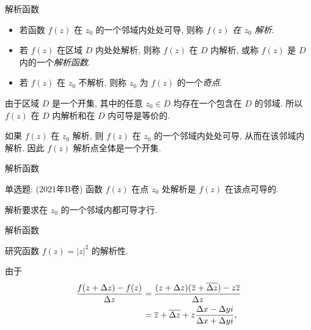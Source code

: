 \begin{frame}{解析函数}
	\onslide<+->
	\begin{definition}
		\begin{itemize}
			\item 若函数 $f(z)$ 在 $z_0$ 的一个邻域内处处可导, 则称 \emph{$f(z)$ 在 $z_0$ 解析}.
			\item 若 $f(z)$ 在区域 $D$ 内处处解析, 则称 $f(z)$ 在 $D$ 内解析, 或称 $f(z)$ 是 $D$ 内的一个\emph{解析函数}.
			\item 若 $f(z)$ 在 $z_0$ 不解析, 则称 $z_0$ 为 $f(z)$ 的一个\emph{奇点}.
		\end{itemize}
	\end{definition}

	\onslide<+->
	由于区域 $D$ 是一个开集, 其中的任意 $z_0\in D$ 均存在一个包含在 $D$ 的邻域. 
	\onslide<+->
	所以 \alert{$f(z)$ 在 $D$ 内解析和在 $D$ 内可导是等价的}.

	\onslide<+->
	如果 $f(z)$ 在 $z_0$ 解析, 则 $f(z)$ 在 $z_0$ 的一个邻域内处处可导, 从而在该邻域内解析.
	\onslide<+->
	因此 \alert{$f(z)$ 解析点全体是一个开集}.
\end{frame}


\begin{frame}{解析函数}
	\onslide<+->
	\begin{exercise}
		单选题: (2021年B卷) 函数 $f(z)$ 在点 $z_0$ 处解析是 $f(z)$ 在该点可导的.
	\end{exercise}

	\onslide<+->
	\begin{answer}
		解析要求在 $z_0$ 的一个邻域内都可导才行.
	\end{answer}
\end{frame}

\begin{frame}{解析函数}
	\onslide<+->
	\begin{example}
		研究函数 $f(z)=|z|^2$ 的解析性.
	\end{example}

	\onslide<+->
	\begin{solution*}
		由于
		\begin{align*}
			\frac{f(z+\Delta z)-f(z)}{\Delta z}
			&=\frac{(z+\Delta z)(\overline z+\overline{\Delta z})-z\overline z}{\Delta z}\\
			&=\overline z+\overline{\Delta z}+z\frac{\Delta x-\Delta yi}{\Delta x+\Delta yi},
		\end{align*}



	\end{solution*}
\end{frame}

